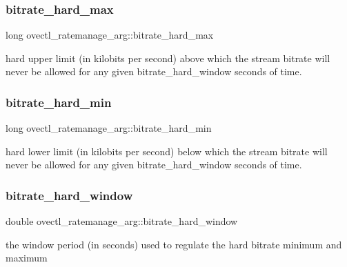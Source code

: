 \subsubsection{\texorpdfstring{bitrate\+\_\+hard\+\_\+max}{bitrate\_hard\_max}}
{\footnotesize\ttfamily long ovectl\+\_\+ratemanage\+\_\+arg\+::bitrate\+\_\+hard\+\_\+max}

hard upper limit (in kilobits per second) above which the stream bitrate will never be allowed for any given bitrate\+\_\+hard\+\_\+window seconds of time. \mbox{\label{structovectl__ratemanage__arg_a449d3ea8d0645742af859dd17b41fbfb}} 
\subsubsection{\texorpdfstring{bitrate\+\_\+hard\+\_\+min}{bitrate\_hard\_min}}
{\footnotesize\ttfamily long ovectl\+\_\+ratemanage\+\_\+arg\+::bitrate\+\_\+hard\+\_\+min}

hard lower limit (in kilobits per second) below which the stream bitrate will never be allowed for any given bitrate\+\_\+hard\+\_\+window seconds of time. \mbox{\label{structovectl__ratemanage__arg_a68caf36fc02a52199705fa331d118446}} 
\subsubsection{\texorpdfstring{bitrate\+\_\+hard\+\_\+window}{bitrate\_hard\_window}}
{\footnotesize\ttfamily double ovectl\+\_\+ratemanage\+\_\+arg\+::bitrate\+\_\+hard\+\_\+window}

the window period (in seconds) used to regulate the hard bitrate minimum and maximum \mbox{\label{structovectl__ratemanage__arg_ad792d1b89a5d07f0f0e90509df4bc606}} 
